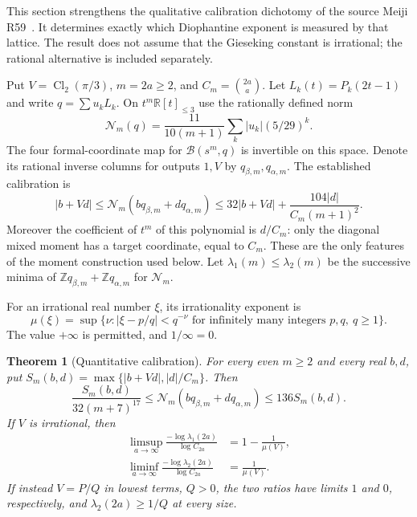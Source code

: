 \documentclass[11pt,a4paper]{article}
\numberwithin{equation}{section}
\newtheorem{theorem}{Theorem}[section]
\theoremstyle{definition}\newtheorem{definition}[theorem]{Definition}
\theoremstyle{remark}\newtheorem{remark}[theorem]{Remark}
\begin{document}
This section strengthens the qualitative calibration dichotomy of the source
Meiji R59~\cite{M59}. It determines exactly which Diophantine exponent is measured by
that lattice. The result does not assume that the Gieseking constant is
irrational; the rational alternative is included separately.

Put $V=\operatorname{Cl}_2(\pi/3)$, $m=2a\ge2$, and
$C_m=\binom{2a}{a}$. Let $L_k(t)=P_k(2t-1)$ and write
$q=\sum u_kL_k$. On $t^m\mathbb R[t]_{\le3}$ use the rationally defined norm
\[
 \mathcal N_m(q)=\frac{11}{10(m+1)}
                   \sum_k |u_k|(5/29)^k.
\]
The four formal-coordinate map for
$\mathcal B(s^m,q)$ is invertible on this space. Denote its rational
inverse columns for outputs $1,V$ by $q_{\beta,m},q_{\alpha,m}$.
The established calibration is
\begin{equation}\label{cal:eq:cal-existing}
 |b+Vd|\le\mathcal N_m(bq_{\beta,m}+dq_{\alpha,m})
 \le32|b+Vd|+\frac{104|d|}{C_m(m+1)^2}.
\end{equation}
Moreover the coefficient of $t^m$ of this polynomial is $d/C_m$:
only the diagonal mixed moment has a target coordinate, equal to $C_m$.
These are the only features of the moment construction used below.
Let $\lambda_1(m)\le\lambda_2(m)$ be the successive minima of
$\mathbb Zq_{\beta,m}+\mathbb Zq_{\alpha,m}$ for $\mathcal N_m$.

For an irrational real number $\xi$, its irrationality exponent is
\[
 \mu(\xi)=\sup\{\nu:|\xi-p/q|<q^{-\nu}
       \text{ for infinitely many integers }p,q,\ q\ge1\}.
\]
The value $+\infty$ is permitted, and $1/\infty=0$.

\begin{theorem}[Quantitative calibration]\label{cal:thm:quant-calibration}
For every even $m\ge2$ and every real $b,d$, put
$S_m(b,d)=\max\{|b+Vd|,|d|/C_m\}$. Then
\begin{equation}\label{cal:eq:poly-equivalence}
 \frac{S_m(b,d)}{32(m+7)^{17}}
 \le \mathcal N_m(bq_{\beta,m}+dq_{\alpha,m})
 \le136S_m(b,d).
\end{equation}
If $V$ is irrational, then
\begin{align}
 \limsup_{a\to\infty}
 \frac{-\log\lambda_1(2a)}{\log C_{2a}}
 &=1-\frac1{\mu(V)},\label{cal:eq:lambda1-mu}\\
 \liminf_{a\to\infty}
 \frac{-\log\lambda_2(2a)}{\log C_{2a}}
 &=\frac1{\mu(V)}.\label{cal:eq:lambda2-mu}
\end{align}
If instead $V=P/Q$ in lowest terms, $Q>0$, the two ratios
have limits $1$ and $0$, respectively, and
$\lambda_2(2a)\ge1/Q$ at every size.
\end{theorem}
\end{document}
